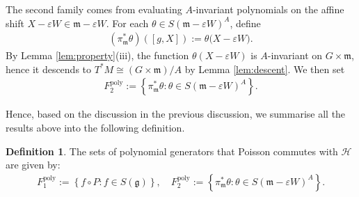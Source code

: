 \documentclass[11pt]{amsart}
\theoremstyle{definition}
\newtheorem{definition}[theorem]{Definition}
\theoremstyle{plain}
\theoremstyle{conclusion}
\begin{document}
The second family comes from evaluating $A$-invariant polynomials on the affine shift $X-\varepsilon W\in\mathfrak{m}-\varepsilon W$. For each $\theta\in S(\mathfrak{m}-\varepsilon W)^A$, define
\begin{align}
    (\pi_{\mathfrak{m}}^*\theta)([g,X]) := \theta\bigl(X-\varepsilon W\bigr). \label{eq:ainv}
\end{align}
By Lemma \ref{lem:property}(iii), the function $\theta(X-\varepsilon W)$ is $A$-invariant on $G\times\mathfrak{m}$, hence it descends to $T^*M\cong (G\times\mathfrak{m})/A$ by Lemma \ref{lem:descent}. We then set
\begin{align}
F_2^{\mathrm{poly}}:=\left\{    \pi_\mathfrak{m}^*\theta :  \theta \in S(\mathfrak{m} -\varepsilon W)^A \right\}. 
\end{align}

Hence, based on the discussion in the previous discussion, we summarise all the results above into the following definition.
\begin{definition}
\label{def:families}
The sets of polynomial generators that Poisson commutes with $\mathcal{H}$  are given by: \begin{align}
F_1^{\mathrm{poly}}  := \left\{ f\circ P : f \in S(\mathfrak{g}) \right\}, \quad  F_2^{\mathrm{poly}}  := \left\{  \pi_\mathfrak{m}^*\theta : \theta \in S(\mathfrak{m} -\varepsilon W)^A \right\}. \label{eq:intm}
\end{align}    
\end{definition}

 

\end{document}
